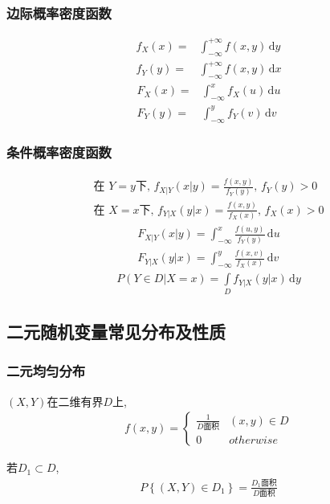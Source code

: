 \subsubsection{边际概率密度函数}
\begin{align*}
    f_X(x)=&\int_{-\infty}^{+\infty}f(x,y)\,\mathrm{d}y\\
    f_Y(y)=&\int_{-\infty}^{+\infty}f(x,y)\,\mathrm{d}x
\end{align*}
\begin{align*}
    F_X(x)=&\int_{-\infty}^x f_X(u)\,\mathrm{d}u\\
    F_Y(y)=&\int_{-\infty}^y f_Y(v)\,\mathrm{d}v
\end{align*}

\subsubsection{条件概率密度函数}
\begin{align*}
    \text{在 $Y=y$下, }f_{X|Y}(x|y)=\frac{f(x,y)}{f_Y(y)}, \, f_Y(y)>0\\
    \text{在 $X=x$下, }f_{Y|X}(y|x)=\frac{f(x,y)}{f_X(x)}, \, f_X(x)>0
\end{align*}
\begin{align*}
    F_{X|Y}(x|y)=\int_{-\infty}^x \frac{f(u,y)}{f_Y(y)}\,\mathrm{d}u\\
    F_{Y|X}(y|x)=\int_{-\infty}^y \frac{f(x,v)}{f_X(x)}\,\mathrm{d}v
\end{align*}
\begin{align*}
    P(Y\in D| X=x)=\underset{D}{\int}f_{Y|X}(y|x)\,\mathrm{d}y
\end{align*}

\subsection{二元随机变量常见分布及性质}
\subsubsection{二元均匀分布}
$(X,Y)$在二维有界$D$上, 
\begin{align*}
    f(x,y)=\left\{\begin{array}{lc}
        \frac{1}{D\text{面积}} & (x,y)\in D\\0 & otherwise
    \end{array} \right.
\end{align*}

若$D_1\subset D$, 
\begin{align*}
    P\left\{(X,Y)\in D_1\right\}=\frac{D_1\text{面积}}{D\text{面积}}
\end{align*}

